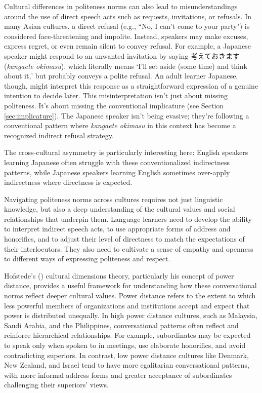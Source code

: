 Cultural differences in politeness norms can also lead to misunderstandings around the use of direct speech acts such as requests, invitations, or refusals. In many Asian cultures, a direct refusal (e.g., ``No, I can't come to your party") is considered face-threatening and impolite. Instead, speakers may make excuses, express regret, or even remain silent to convey refusal. For example, a Japanese speaker might respond to an unwanted invitation by saying 考えておきます (\textit{kangaete okimasu}), which literally means `I'll set aside (some time) and think about it,' but probably conveys a polite refusal. An adult learner Japanese, though, might interpret this response as a straightforward expression of a genuine intention to decide later. This misinterpretation isn't just about missing politeness. It's about missing the conventional implicature (see Section \ref{sec:implicature}). The Japanese speaker isn't being evasive; they're following a conventional pattern where \textit{kangaete okimasu} in this context has become a recognized indirect refusal strategy.

The cross-cultural asymmetry is particularly interesting here: English speakers learning Japanese often struggle with these conventionalized indirectness patterns, while Japanese speakers learning English sometimes over-apply indirectness where directness is expected.

Navigating politeness norms across cultures requires not just linguistic knowledge, but also a deep understanding of the cultural values and social relationships that underpin them. Language learners need to develop the ability to interpret indirect speech acts, to use appropriate forms of address and honorifics, and to adjust their level of directness to match the expectations of their interlocutors. They also need to cultivate a sense of empathy and openness to different ways of expressing politeness and respect.

Hofstede's (\citeyear{hofstede2001}) cultural dimensions theory, particularly his concept of power distance, provides a useful framework for understanding how these conversational norms reflect deeper cultural values. Power distance refers to the extent to which less powerful members of organizations and institutions accept and expect that power is distributed unequally. In high power distance cultures, such as Malaysia, Saudi Arabia, and the Philippines, conversational patterns often reflect and reinforce hierarchical relationships. For example, subordinates may be expected to speak only when spoken to in meetings, use elaborate honorifics, and avoid contradicting superiors. In contrast, low power distance cultures like Denmark, New Zealand, and Israel tend to have more egalitarian conversational patterns, with more informal address forms and greater acceptance of subordinates challenging their superiors' views.

